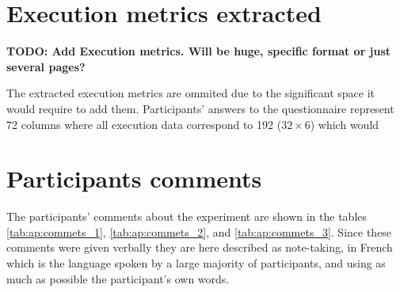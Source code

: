 \section{Execution metrics extracted}

\textbf{TODO: Add Execution metrics. Will be huge, specific format or just several pages?}

The extracted execution metrics are ommited due to the significant space it would require to add them. Participants' answers to the questionnaire represent 72 columns where all execution data correspond to 192 ($32 \times 6$) which would  

\section{Participants comments}

The participants' comments about the experiment are shown in the tables \ref{tab:ap:commets_1}, \ref{tab:ap:commets_2}, and \ref{tab:ap:commets_3}. Since these comments were given verbally they are here described as note-taking, in French which is the language spoken by a large majority of participants, and using as much as possible the participant's own words.




